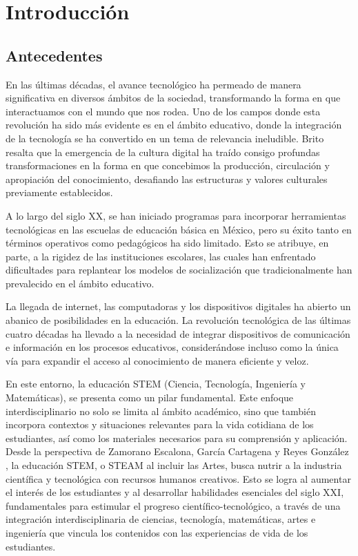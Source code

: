 \chapter{Introducción}\label{ch:Introducción}

\section{Antecedentes}
En las últimas décadas, el avance tecnológico ha permeado de manera significativa en diversos ámbitos de la sociedad, transformando la forma en que interactuamos con el mundo que nos rodea. Uno de los campos donde esta revolución ha sido más evidente es en el ámbito educativo, donde la integración de la tecnología se ha convertido en un tema de relevancia ineludible. Brito \cite{Brito2015} resalta que la emergencia de la cultura digital ha traído consigo profundas transformaciones en la forma en que concebimos la producción, circulación y apropiación del conocimiento, desafiando las estructuras y valores culturales previamente establecidos.

A lo largo del siglo XX, se han iniciado programas para incorporar herramientas tecnológicas en las escuelas de educación básica en México, pero su éxito tanto en términos operativos como pedagógicos ha sido limitado. Esto se atribuye, en parte, a la rigidez de las instituciones escolares, las cuales han enfrentado dificultades para replantear los modelos de socialización que tradicionalmente han prevalecido en el ámbito educativo\cite{Trejo-Quintana2020}.

La llegada de internet, las computadoras y los dispositivos digitales ha abierto un abanico de posibilidades en la educación. La revolución tecnológica de las últimas cuatro décadas ha llevado a la necesidad de integrar dispositivos de comunicación e información en los procesos educativos, considerándose incluso como la única vía para expandir el acceso al conocimiento de manera eficiente y veloz\cite{Trejo-Quintana2020}.

En este entorno, la educación STEM (Ciencia, Tecnología, Ingeniería y Matemáticas), se presenta como un pilar fundamental. Este enfoque interdisciplinario no solo se limita al ámbito académico, sino que también incorpora contextos y situaciones relevantes para la vida cotidiana de los estudiantes, así como los materiales necesarios para su comprensión y aplicación\cite{Sanchez2018}. Desde la perspectiva de Zamorano Escalona, García Cartagena y Reyes González \cite{Zamorano2018}, la educación STEM, o STEAM al incluir las Artes, busca nutrir a la industria científica y tecnológica con recursos humanos creativos. Esto se logra al aumentar el interés de los estudiantes y al desarrollar habilidades esenciales del siglo XXI, fundamentales para estimular el progreso científico-tecnológico, a través de una integración interdisciplinaria de ciencias, tecnología, matemáticas, artes e ingeniería que vincula los contenidos con las experiencias de vida de los estudiantes.

